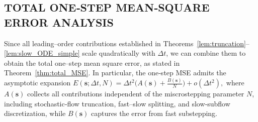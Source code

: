 \documentclass{article}
\begin{document}

\subsection{TOTAL ONE‑STEP MEAN‑SQUARE ERROR ANALYSIS}

Since all leading--order contributions established in 
Theorems~\ref{lem:truncation}--\ref{lem:slow_ODE_simple}
scale quadratically with $\Delta t$, we can combine them to obtain the total one--step mean square error, as stated in Theorem~\ref{thm:total_MSE}. In particular, the one‑step MSE admits the asymptotic expansion
\(
E(\pmb{s};\Delta t,N)
=
\Delta t^2
\bigl(
A(\pmb{s})+\tfrac{B(\pmb{s})}{N}
\bigr)
+ o(\Delta t^2),
\)
where $A(\pmb{s})$ collects all contributions independent of the miscrostepping parameter $N$, including stochastic‑flow truncation, fast–slow splitting, and slow‑subflow discretization, while $B(\pmb{s})$ captures the error from fast substepping.
\end{document}

